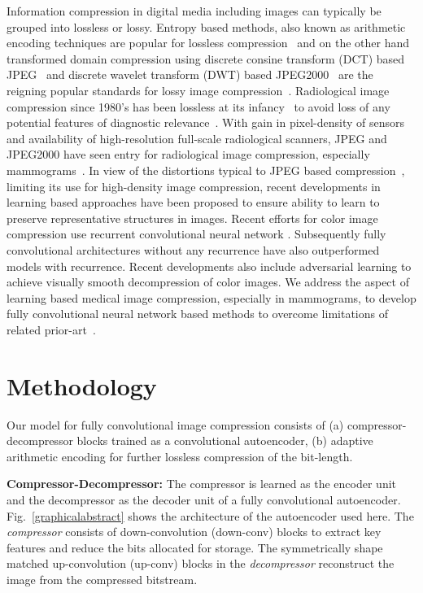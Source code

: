 \documentclass[10pt,twocolumn,letterpaper]{article}
\begin{document}
Information compression in digital media including images can typically be grouped into lossless or lossy. Entropy based methods, also known as arithmetic encoding techniques are popular for lossless compression~\cite{kuduvalli1992performance} and on the other hand transformed domain compression using discrete consine transform (DCT) based JPEG~\cite{wallace1992jpeg} and discrete wavelet transform (DWT) based JPEG2000~\cite{skodras2001jpeg} are the reigning popular standards for lossy image compression~\cite{saha2000image}. Radiological image compression since 1980's has been lossless at its infancy~\cite{wong1995radiologic} to avoid loss of any potential features of diagnostic relevance~\cite{kuduvalli1992performance}. With gain in pixel-density of sensors and availability of high-resolution full-scale radiological scanners, JPEG and JPEG2000 have seen entry for radiological image compression, especially mammograms~\cite{khademi2006comparison}. In view of the distortions typical to JPEG based compression~\cite{corchs2014no}, limiting its use for high-density image compression, recent developments in learning based approaches have been proposed to ensure ability to learn to preserve representative structures in images. Recent efforts for color image compression use recurrent convolutional neural network \cite{toderici2016full,johnston2017improved}. Subsequently fully convolutional architectures without any recurrence \cite{theis2017lossy} have also outperformed models with recurrence. Recent developments also include adversarial learning \cite{rippel2017real} to achieve visually smooth decompression of color images. We address the aspect of learning based medical image compression, especially in mammograms, to develop fully convolutional neural network based methods to overcome limitations of related prior-art~\cite{tan2011using}.

\section{Methodology}

Our model for fully convolutional image compression consists of (a) compressor-decompressor blocks trained as a convolutional autoencoder, (b) adaptive arithmetic encoding for further lossless compression of the bit-length.

\textbf{Compressor-Decompressor:} The compressor is learned as the encoder unit and the decompressor as the decoder unit of a fully convolutional autoencoder. Fig.~\ref{graphicalabstract} shows the architecture of the autoencoder used here. The \emph{compressor} consists of down-convolution (down-conv) blocks to extract key features and reduce the bits allocated for storage. The symmetrically shape matched up-convolution (up-conv) blocks in the \emph{decompressor} reconstruct the image from the compressed bitstream. 
\end{document}
